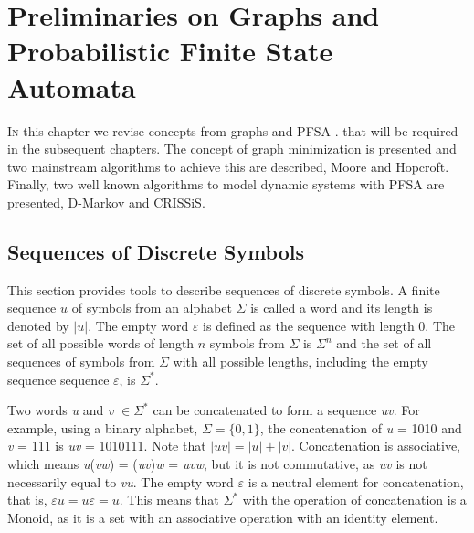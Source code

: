 \chapter{Preliminaries on Graphs and Probabilistic Finite State Automata}\label{cap:2}


{\lettrine[loversize=0.25,findent=0.2em,nindent=0em]{I}{n} this chapter we revise concepts from graphs and PFSA \cite{brianmarcus}\cite{vidal.05}. that will be required in the subsequent chapters. The concept of graph minimization is presented and two mainstream algorithms to achieve this are described, Moore and Hopcroft. Finally, two well known algorithms to model dynamic systems with PFSA are presented, D-Markov and CRISSiS.

\section{Sequences of Discrete Symbols}
This section provides tools to describe sequences of discrete symbols. A finite sequence $u$ of symbols from an alphabet $\Sigma$ is called a word and its length is denoted by $|\textit{u}|$. The empty word $\varepsilon$ is defined as the sequence with length 0. The set of all possible words of length $n$ symbols from $\Sigma$ is $\Sigma^n$ and the set of all sequences of symbols from $\Sigma$ with all possible lengths, including the empty sequence sequence $\varepsilon$, is $\Sigma^*$. 

Two words \textit{u} and \textit{v} $\in \Sigma^*$ can be concatenated to form a sequence \textit{uv}. For example, using a binary alphabet, $\Sigma = \{0,1\}$, the concatenation of \textit{u} = 1010 and \textit{v} = 111 is \textit{uv} = 1010111. Note that $|\textit{uv}| = |\textit{u}| + |\textit{v}|$. Concatenation is associative, which means \textit{u}(\textit{vw}) = (\textit{uv})\textit{w} = \textit{uvw}, but it is not commutative, as \textit{uv} is not necessarily equal to \textit{vu}. The empty word $\varepsilon$ is a neutral element for concatenation, that is, $\varepsilon u = u\varepsilon = u$. This means that $\Sigma^*$ with the operation of concatenation is a Monoid, as it is a set with an associative operation with an identity element.

}
